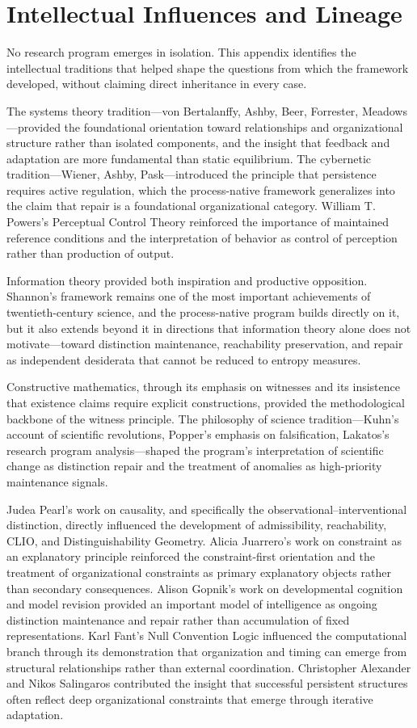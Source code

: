 \documentclass[11pt, oneside]{book}
\theoremstyle{definition}
\theoremstyle{remark}
\begin{document}
\chapter{Intellectual Influences and Lineage}

No research program emerges in isolation. This appendix identifies the intellectual traditions that helped shape the questions from which the framework developed, without claiming direct inheritance in every case.

The systems theory tradition—von Bertalanffy, Ashby, Beer, Forrester, Meadows—provided the foundational orientation toward relationships and organizational structure rather than isolated components, and the insight that feedback and adaptation are more fundamental than static equilibrium. The cybernetic tradition—Wiener, Ashby, Pask—introduced the principle that persistence requires active regulation, which the process-native framework generalizes into the claim that repair is a foundational organizational category. William T. Powers's Perceptual Control Theory reinforced the importance of maintained reference conditions and the interpretation of behavior as control of perception rather than production of output.

Information theory provided both inspiration and productive opposition. Shannon's framework remains one of the most important achievements of twentieth-century science, and the process-native program builds directly on it, but it also extends beyond it in directions that information theory alone does not motivate—toward distinction maintenance, reachability preservation, and repair as independent desiderata that cannot be reduced to entropy measures.

Constructive mathematics, through its emphasis on witnesses and its insistence that existence claims require explicit constructions, provided the methodological backbone of the witness principle. The philosophy of science tradition—Kuhn's account of scientific revolutions, Popper's emphasis on falsification, Lakatos's research program analysis—shaped the program's interpretation of scientific change as distinction repair and the treatment of anomalies as high-priority maintenance signals.

Judea Pearl's work on causality, and specifically the observational--interventional distinction, directly influenced the development of admissibility, reachability, CLIO, and Distinguishability Geometry. Alicia Juarrero's work on constraint as an explanatory principle reinforced the constraint-first orientation and the treatment of organizational constraints as primary explanatory objects rather than secondary consequences. Alison Gopnik's work on developmental cognition and model revision provided an important model of intelligence as ongoing distinction maintenance and repair rather than accumulation of fixed representations. Karl Fant's Null Convention Logic influenced the computational branch through its demonstration that organization and timing can emerge from structural relationships rather than external coordination. Christopher Alexander and Nikos Salingaros contributed the insight that successful persistent structures often reflect deep organizational constraints that emerge through iterative adaptation.
\end{document}
